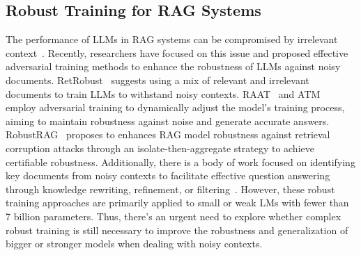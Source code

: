 \subsection{Robust Training for RAG Systems}
The performance of LLMs in RAG systems can be compromised by irrelevant context~\cite{DBLP:conf/sigir/CuconasuTSFCMTS24,DBLP:journals/corr/abs-2408-13533}. Recently, researchers have focused on this issue and proposed effective adversarial training methods to enhance the robustness of LLMs against noisy documents. RetRobust~\cite{DBLP:conf/iclr/YoranWRB24} suggests using a mix of relevant and irrelevant documents to train LLMs to withstand noisy contexts. RAAT~\cite{fang-etal-2024-enhancing} and ATM~\cite{zhu-etal-2024-atm} employ adversarial training to dynamically adjust the model’s training process, aiming to maintain robustness against noise and generate accurate answers. RobustRAG~\cite{DBLP:journals/corr/abs-2405-15556} proposes to enhances RAG model robustness against retrieval corruption attacks through an isolate-then-aggregate strategy to achieve certifiable robustness. Additionally, there is a body of work focused on identifying key documents from noisy contexts to facilitate effective question answering through knowledge rewriting, refinement, or filtering~\cite{zhu-etal-2024-information,DBLP:journals/corr/abs-2406-08116,jin-etal-2024-bider,DBLP:journals/corr/abs-2411-14572}. However, these robust training approaches are primarily applied to small or weak LMs with fewer than 7 billion parameters. Thus, there’s an urgent need to explore whether complex robust training is still necessary to improve the robustness and generalization of bigger or stronger models when dealing with noisy contexts.